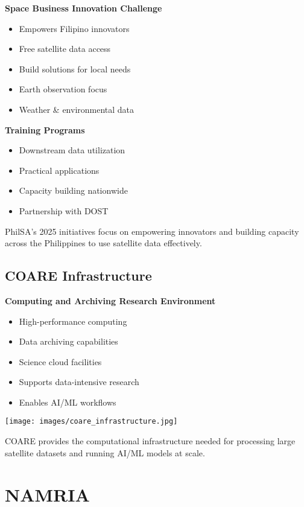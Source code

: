 \documentclass[
  letterpaper,
  DIV=11,
  numbers=noendperiod]{scrartcl}
\providecommand{\tightlist}{%
  \setlength{\itemsep}{0pt}\setlength{\parskip}{0pt}}
\begin{document}
\textbf{Space Business Innovation Challenge}

\begin{itemize}
\tightlist
\item
  Empowers Filipino innovators
\item
  Free satellite data access
\item
  Build solutions for local needs
\item
  Earth observation focus
\item
  Weather \& environmental data
\end{itemize}

\textbf{Training Programs}

\begin{itemize}
\tightlist
\item
  Downstream data utilization
\item
  Practical applications
\item
  Capacity building nationwide
\item
  Partnership with DOST
\end{itemize}

PhilSA's 2025 initiatives focus on empowering innovators and building
capacity across the Philippines to use satellite data effectively.

\subsection{COARE Infrastructure}\label{coare-infrastructure}

\textbf{Computing and Archiving Research Environment}

\begin{itemize}
\tightlist
\item
  High-performance computing
\item
  Data archiving capabilities
\item
  Science cloud facilities
\item
  Supports data-intensive research
\item
  Enables AI/ML workflows
\end{itemize}

\texttt{[image: images/coare\_infrastructure.jpg]}

COARE provides the computational infrastructure needed for processing
large satellite datasets and running AI/ML models at scale.

\section{NAMRIA}\label{namria}
\end{document}
